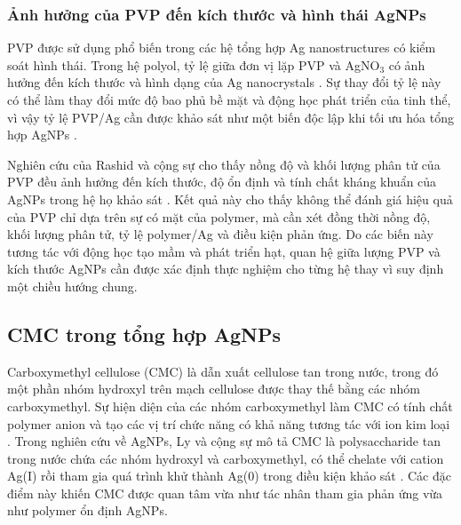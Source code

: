 \subsubsection{Ảnh hưởng của PVP đến kích thước và hình thái AgNPs}
PVP được sử dụng phổ biến trong các hệ tổng hợp Ag nanostructures có kiểm soát hình thái.
Trong hệ polyol, tỷ lệ giữa đơn vị lặp PVP và AgNO$_3$ có ảnh hưởng đến kích thước và hình dạng của Ag nanocrystals \parencite{sunxia2002,wiley2005}.
Sự thay đổi tỷ lệ này có thể làm thay đổi mức độ bao phủ bề mặt và động học phát triển của tinh thể, vì vậy tỷ lệ PVP/Ag cần được khảo sát như một biến độc lập khi tối ưu hóa tổng hợp AgNPs \parencite{chen2019,wiley2005}.
\par
Nghiên cứu của Rashid và cộng sự cho thấy nồng độ và khối lượng phân tử của PVP đều ảnh hưởng đến kích thước, độ ổn định và tính chất kháng khuẩn của AgNPs trong hệ họ khảo sát \parencite{rashid2026}.
Kết quả này cho thấy không thể đánh giá hiệu quả của PVP chỉ dựa trên sự có mặt của polymer, mà cần xét đồng thời nồng độ, khối lượng phân tử, tỷ lệ polymer/Ag và điều kiện phản ứng.
Do các biến này tương tác với động học tạo mầm và phát triển hạt, quan hệ giữa lượng PVP và kích thước AgNPs cần được xác định thực nghiệm cho từng hệ thay vì suy định một chiều hướng chung.
\subsection{CMC trong tổng hợp AgNPs}
Carboxymethyl cellulose (CMC) là dẫn xuất cellulose tan trong nước, trong đó một phần nhóm hydroxyl trên mạch cellulose được thay thế bằng các nhóm carboxymethyl.
Sự hiện diện của các nhóm carboxymethyl làm CMC có tính chất polymer anion và tạo các vị trí chức năng có khả năng tương tác với ion kim loại \parencite{rahman2021}.
Trong nghiên cứu về AgNPs, Ly và cộng sự mô tả CMC là polysaccharide tan trong nước chứa các nhóm hydroxyl và carboxymethyl, có thể chelate với cation Ag(I) rồi tham gia quá trình khử thành Ag(0) trong điều kiện khảo sát \parencite{ly2024}.
Các đặc điểm này khiến CMC được quan tâm vừa như tác nhân tham gia phản ứng vừa như polymer ổn định AgNPs.
